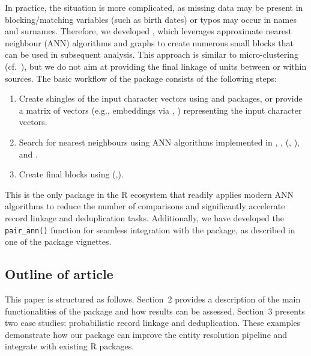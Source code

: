In practice, the situation is more complicated, as missing data may be
present in blocking/matching variables (such as birth dates) or typos
may occur in names and surnames. Therefore, we developed
, which leverages approximate nearest neighbour (ANN)
algorithms and graphs to create numerous small blocks that can be used
in subsequent analysis. This approach is similar to micro-clustering
(cf.~\citet{johndrow2018theoretical}), but we do not aim at providing the final
linkage of units between or within sources. The basic workflow of the
 package consists of the following steps:

\begin{enumerate}
\def\labelenumi{\arabic{enumi}.}
\tightlist
\item
  Create shingles of the input character vectors using
   \citep{tokenizers} and 
  \citep{text2vec} packages, or provide a matrix of vectors (e.g.,
  embeddings via , \citet{ragnar}) representing the input
  character vectors.
\item
  Search for nearest neighbours using ANN algorithms implemented in
   \citep{rnndescent},  \citep{RcppHNSW},
   (\citet{mlpack2023}, \citet{mlpack2025}), and 
  \citep{RcppAnnoy}.
\item
  Create final blocks using  (\citet{igraph2025},\citet{igraph2006}).
\end{enumerate}

This is the only package in the R ecosystem that readily applies modern
ANN algorithms to reduce the number of comparisons and significantly
accelerate record linkage and deduplication tasks. Additionally, we have
developed the \texttt{pair\_ann()} function for seamless integration with the
 package, as described in one of the package vignettes.

\subsection{Outline of article}\label{outline-of-article}

This paper is structured as follows. Section~2 provides a description of
the main functionalities of the  package and how
results can be assessed. Section~3 presents two case studies:
probabilistic record linkage and deduplication. These examples
demonstrate how our package can improve the entity resolution pipeline
and integrate with existing R packages.

